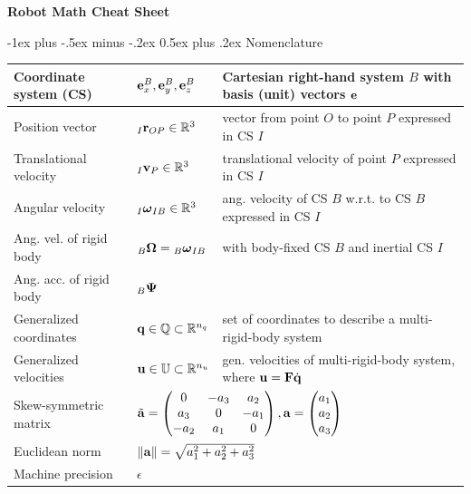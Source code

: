 \documentclass[10pt,landscape,a4paper]{article}
\makeatletter
\renewcommand{\section}{\@startsection{section}{1}{0mm}%
                                {-1ex plus -.5ex minus -.2ex}%
                                {0.5ex plus .2ex}%
                                {\normalfont\large\bfseries}}
\makeatother
\begin{document}
\raggedright
\footnotesize
\begin{multicols}{2}


\setlength{\premulticols}{1pt}
\setlength{\postmulticols}{1pt}
\setlength{\multicolsep}{1pt}
\setlength{\columnsep}{2pt}

\begin{center}
     \Large{\textbf{Robot Math Cheat Sheet}} \\
\end{center}
\section{Nomenclature }
\begin{tabular}{|l|l|l|}
\hline
Coordinate system (CS) & ${\mathbf e_x^B,\mathbf e_y^B,\mathbf e_z^B}$ & Cartesian right-hand system $B$ with basis (unit) vectors $\mathbf e$  \\ \hline
Position vector & ${}_I\mathbf r_{OP} \in \mathbb{R}^3 $ & vector from point $O$ to point $P$ expressed in CS $I$ \\ \hline 
Translational velocity & ${}_I\mathbf v_P \in \mathbb{R}^3 $  & translational velocity of point $P$ expressed in CS $I$ \\ \hline
Angular velocity & ${}_I\mbox{\boldmath $\omega$}_{IB} \in \mathbb{R}^3 $ & ang. velocity of CS $B$ w.r.t. to CS $B$ expressed in CS $I$ \\ \hline
Ang. vel. of rigid body & ${}_B\mathbf \Omega = {}_B\mbox{\boldmath $\omega$}_{IB}$ & with body-fixed CS $B$ and inertial CS $I$ \\ \hline
Ang. acc. of rigid body & ${}_B\mathbf \Psi$ \\ \hline
Generalized coordinates & $\mathbf q \in \mathbb{Q} \subset \mathbb{R}^{n_q}$ & set of coordinates to describe a multi-rigid-body system\\ \hline
Generalized velocities & $\mathbf u \in \mathbb{U} \subset \mathbb{R}^{n_u}$ & gen. velocities of multi-rigid-body system, where $\mathbf u = \mathbf F\dot{\mathbf q}$\\ \hline
Skew-symmetric matrix & \multicolumn{2}{l|}{$\tilde{\mathbf a} = \begin{pmatrix} 0 & -a_3 & a_2 \\ a_3 & 0 & -a_1 \\ -a_2 & a_1 & 0 \end{pmatrix}, \mathbf a = \begin{pmatrix} a_1 \\ a_2 \\ a_3\end{pmatrix}$}  \\ \hline
Euclidean norm & \multicolumn{2}{l|}{$\lVert \mathbf a \rVert = \sqrt{a_1^2 + a_2^2 + a_3^2}$} \\ \hline
Machine precision & $\epsilon$ & \\ \hline
\end{tabular}


\end{multicols}
\end{document}
